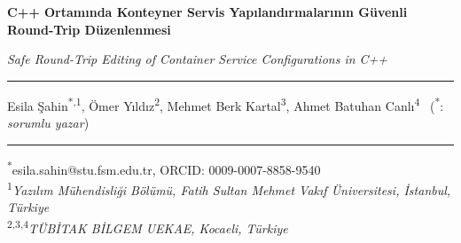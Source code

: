 \documentclass[12pt,a4paper]{article}
\begin{document}
\thispagestyle{globcerfirst}

\begin{center}
{\large\bfseries C++ Ortamında Konteyner Servis Yapılandırmalarının
Güvenli Round-Trip Düzenlenmesi\par}
\smallskip
{\itshape Safe Round-Trip Editing of Container Service Configurations in C++\par}
\end{center}

\noindent\rule{\textwidth}{0.4pt}
\begin{center}
Esila Şahin\textsuperscript{*,1}, Ömer Yıldız\textsuperscript{2},
Mehmet Berk Kartal\textsuperscript{3}, Ahmet Batuhan Canlı\textsuperscript{4}
\ (\textsuperscript{*}: \textit{sorumlu yazar})
\end{center}
\noindent\rule{\textwidth}{0.4pt}

\begin{center}\small
\textsuperscript{*}esila.sahin@stu.fsm.edu.tr, ORCID: 0009-0007-8858-9540\\
\textsuperscript{1}\textit{Yazılım Mühendisliği Bölümü, Fatih Sultan Mehmet
Vakıf Üniversitesi, İstanbul, Türkiye}\\
\textsuperscript{2,3,4}\textit{TÜBİTAK BİLGEM UEKAE, Kocaeli, Türkiye}
\end{center}

\bigskip
\end{document}
